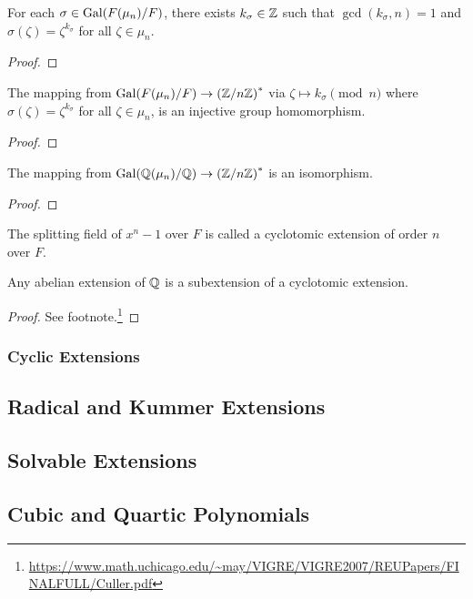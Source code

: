\begin{lemma}
    For each \(\sigma \in \operatorname{Gal}(F(\mu_n)/F)\),
    there exists \(k_\sigma \in \mathbb{Z}\) such that \(\gcd(k_\sigma,n) = 1\)
    and \(\sigma(\zeta) = \zeta^{k_\sigma}\) for all \(\zeta \in \mu_n\).
\end{lemma}
\begin{proof}
\end{proof}
\begin{theorem}
    The mapping from \(\operatorname{Gal}(F(\mu_n)/F) \to {(\mathbb{Z}/n\mathbb{Z})}^\ast\)
    via \(\zeta \mapsto k_\sigma \pmod{n}\)
    where \(\sigma(\zeta) = \zeta^{k_\sigma}\) for all \(\zeta \in \mu_n\),
    is an injective group homomorphism.
\end{theorem}
\begin{proof}
\end{proof}
\begin{theorem}
    The mapping from \(\operatorname{Gal}(\mathbb{Q}(\mu_n)/\mathbb{Q}) \to {(\mathbb{Z}/n\mathbb{Z})}^\ast\)
    is an isomorphism.
\end{theorem}
\begin{proof}
\end{proof}

\begin{definition}
    The splitting field of \(x^n - 1\) over \(F\)
    is called a cyclotomic extension of order \(n\) over \(F\).
\end{definition}
\begin{theorem}
    Any abelian extension of \(\mathbb{Q}\)
    is a subextension of a cyclotomic extension.
\end{theorem}
\begin{proof}
    See footnote.\footnote{%
        \url{https://www.math.uchicago.edu/~may/VIGRE/VIGRE2007/REUPapers/FINALFULL/Culler.pdf}
    }
\end{proof}

\subsubsection*{Cyclic Extensions}




\subsection{Radical and Kummer Extensions}


\subsection{Solvable Extensions}


\subsection{Cubic and Quartic Polynomials}

